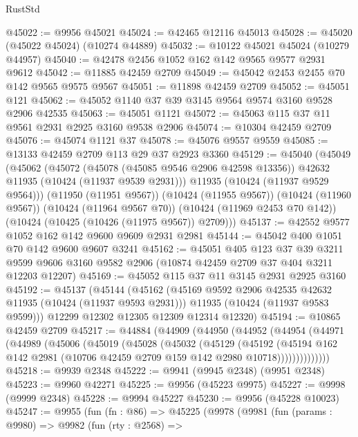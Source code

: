 \begin{lexlean}{RustStd}
\begin{coremodule}
@45022 := @9956 @45021
@45024 := @42465 @12116 @45013
@45028 := @45020 (@45022 @45024) (@10274 @44889)
@45032 := @10122 @45021 @45024 (@10279 @44957)
@45040 := @42478 @2456 @1052 @162 @142 @9565 @9577 @2931 @9612
@45042 := @11885 @42459 @2709
@45049 := @45042 @2453 @2455 @70 @142 @9565 @9575 @9567
@45051 := @11898 @42459 @2709
@45052 := @45051 @121
@45062 := @45052 @1140 @37 @39 @3145 @9564 @9574 @3160 @9528 @2906 @42535
@45063 := @45051 @1121
@45072 := @45063 @115 @37 @11 @9561 @2931 @2925 @3160 @9538 @2906
@45074 := @10304 @42459 @2709
@45076 := @45074 @1121 @37
@45078 := @45076 @9557 @9559
@45085 := @13133 @42459 @2709 @113 @29 @37 @2923 @3360
@45129 := @45040
    (@45049
      (@45062
        (@45072
          (@45078 (@45085 @9546 @2906 @42598 @13356))
          @42632
          @11935
          (@10424 (@11937 @9539 @2931)))
        @11935
        (@10424 (@11937 @9529 @9564)))
      (@11950 (@11951 @9567))
      (@10424 (@11955 @9567))
      (@10424 (@11960 @9567))
      (@10424 (@11964 @9567 @70))
      (@10424 (@11969 @2453 @70 @142))
      (@10424 (@10425 (@10426 (@11975 @9567)) @2709)))
@45137 := @42552 @9577 @1052 @162 @142 @9600 @9609 @2931 @2981
@45144 := @45042 @400 @1051 @70 @142 @9600 @9607 @3241
@45162 := @45051
    @405
    @123
    @37
    @39
    @3211
    @9599
    @9606
    @3160
    @9582
    @2906
    (@10874 @42459 @2709 @37 @404 @3211 @12203 @12207)
@45169 := @45052 @115 @37 @11 @3145 @2931 @2925 @3160
@45192 := @45137
    (@45144
      (@45162
        (@45169 @9592 @2906 @42535 @42632 @11935 (@10424 (@11937 @9593 @2931)))
        @11935
        (@10424 (@11937 @9583 @9599)))
      @12299
      @12302
      @12305
      @12309
      @12314
      @12320)
@45194 := @10865 @42459 @2709
@45217 := @44884
    (@44909
      (@44950
        (@44952
          (@44954
            (@44971
              (@44989
                (@45006
                  (@45019
                    (@45028
                      (@45032
                        (@45129
                          (@45192
                            (@45194
                              @162
                              @142
                              @2981
                              (@10706 @42459 @2709 @159 @142 @2980 @10718))))))))))))))
@45218 := @9939 @2348
@45222 := @9941 (@9945 @2348) (@9951 @2348)
@45223 := @9960 @42271
@45225 := @9956 (@45223 @9975)
@45227 := @9998 (@9999 @2348)
@45228 := @9994 @45227
@45230 := @9956 (@45228 @10023)
@45247 := @9955
    (fun (fn : @86) =>
    @45225
      (@9978
        (@9981
          (fun (params : @9980) =>
          @9982
            (fun (rty : @2568) =>

\end{coremodule}
\end{lexlean}
